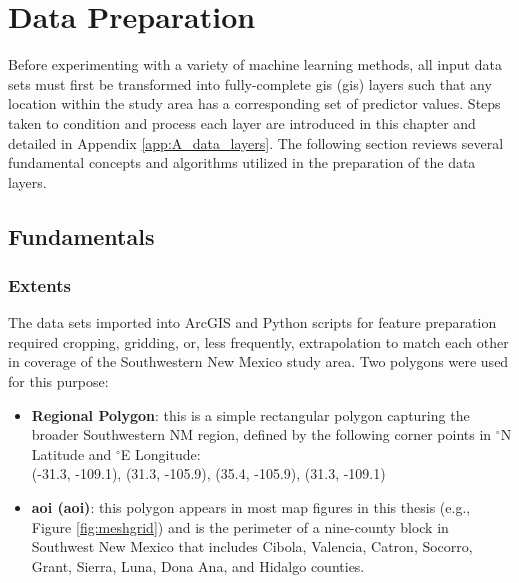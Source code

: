 \section{Data Preparation}\label{ch3:data_prep}
Before experimenting with a variety of machine learning methods, all input data sets must first be transformed into fully-complete \acrlong{gis} (\acrshort{gis}) layers such that any location within the study area has a corresponding set of predictor values. Steps taken to condition and process each layer are introduced in this chapter and detailed in Appendix \ref{app:A_data_layers}. The following section reviews several fundamental concepts and algorithms utilized in the preparation of the data layers.

\subsection{Fundamentals}\label{ch3:data_prep_fundamentals}
\subsubsection{Extents}\label{ch3:extents}
The data sets imported into ArcGIS and Python scripts for feature preparation required cropping, gridding, or, less frequently, extrapolation to match each other in coverage of the Southwestern New Mexico study area. Two polygons were used for this purpose:

\begin{itemize}
\item \textbf{Regional Polygon}: this is a simple rectangular polygon capturing the broader Southwestern NM region, defined by the following corner points in $^\circ$N Latitude and $^\circ$E Longitude: \\ (-31.3, -109.1), (31.3, -105.9), (35.4, -105.9), (31.3, -109.1)
\item \textbf{\acrlong{aoi} (\acrshort{aoi})}: this polygon appears in most map figures in this thesis (e.g., Figure \ref{fig:meshgrid}) and is the perimeter of a nine-county block in Southwest New Mexico that includes Cibola, Valencia, Catron, Socorro, Grant, Sierra, Luna, Dona Ana, and Hidalgo counties.
\end{itemize}

